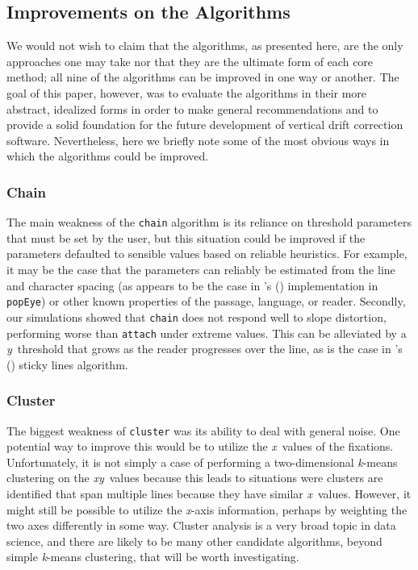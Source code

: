 \documentclass[doc,biblatex]{apa7}
\newcommand\possessivecite[1]{\citeauthor{#1}'s (\citeyear{#1})} %
\begin{document}
\subsection{Improvements on the Algorithms}

We would not wish to claim that the algorithms, as presented here, are the only approaches one may take nor that they are the ultimate form of each core method; all nine of the algorithms can be improved in one way or another. The goal of this paper, however, was to evaluate the algorithms in their more abstract, idealized forms in order to make general recommendations and to provide a solid foundation for the future development of vertical drift correction software. Nevertheless, here we briefly note some of the most obvious ways in which the algorithms could be improved.

\subsubsection{Chain}

The main weakness of the \texttt{chain} algorithm is its reliance on threshold parameters that must be set by the user, but this situation could be improved if the parameters defaulted to sensible values based on reliable heuristics. For example, it may be the case that the parameters can reliably be estimated from the line and character spacing (as appears to be the case in \possessivecite{Schroeder:0000} implementation in \texttt{popEye}) or other known properties of the passage, language, or reader. Secondly, our simulations showed that \texttt{chain} does not respond well to slope distortion, performing worse than \texttt{attach} under extreme values. This can be alleviated by a \textit{y}~threshold that grows as the reader progresses over the line, as is the case in \possessivecite{Hyrskykari:2006} sticky lines algorithm.

\subsubsection{Cluster}

The biggest weakness of \texttt{cluster} was its ability to deal with general noise. One potential way to improve this would be to utilize the \textit{x}~values of the fixations. Unfortunately, it is not simply a case of performing a two-dimensional \textit{k}-means clustering on the \textit{xy}~values because this leads to situations were clusters are identified that span multiple lines because they have similar \textit{x}~values. However, it might still be possible to utilize the \textit{x}-axis information, perhaps by weighting the two axes differently in some way. Cluster analysis is a very broad topic in data science, and there are likely to be many other candidate algorithms, beyond simple \textit{k}-means clustering, that will be worth investigating.
\end{document}
